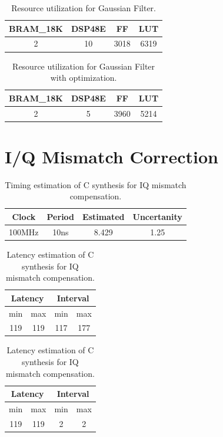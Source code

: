 \documentclass[en,printmode]{mgr}
\begin{document}
	\begin{table}[H]
		\centering
		\caption{}
		\begin{tabular}{|c|c|c|c|}
		\hline
		BRAM\_18K & DSP48E & FF  & LUT \\ \hline
		2         & 10     & 3018 & 6319\\ \hline
		\end{tabular}
		\caption{Resource utilization for Gaussian Filter.}
	\end{table}
	
	\begin{table}[H]
		\centering
		\caption{}
		\begin{tabular}{|c|c|c|c|}
		\hline
		BRAM\_18K & DSP48E & FF  & LUT \\ \hline
		2         & 5      & 3960 & 5214\\ \hline
		\end{tabular}
		\caption{Resource utilization for Gaussian Filter with optimization.}
	\end{table}
	\section{I/Q Mismatch Correction}
	\begin{table}[H]
		\centering
		\caption{}
		\begin{tabular}{|c|c|c|c|}
		\hline
		Clock  & Period & Estimated & Uncertanity \\ \hline
		100MHz & 10ns   & 8.429     & 1.25        \\ \hline
		\end{tabular}
		\caption{Timing estimation of C synthesis for IQ mismatch compensation.}
	\end{table}
	
	\begin{table}[H]
		\centering
		\caption{}
		\begin{tabular}{|c|c|c|c|}
		\hline
		\multicolumn{2}{|c|}{Latency} & \multicolumn{2}{c|}{Interval} \\ \hline
			min           & max           & min           & max           \\ \hline
			119           & 119           & 117           & 177             \\ \hline
		\end{tabular}
		\caption{Latency estimation of C synthesis for IQ mismatch compensation.}
	\end{table}
	
	\begin{table}[H]
		\centering
		\caption{}
		\begin{tabular}{|c|c|c|c|}
		\hline
		\multicolumn{2}{|c|}{Latency} & \multicolumn{2}{c|}{Interval} \\ \hline
			min           & max           & min           & max           \\ \hline
			119           & 119           & 2             & 2             \\ \hline
		\end{tabular}
		\caption{Latency estimation of C synthesis for IQ mismatch compensation.}
	\end{table}
	
\end{document}

